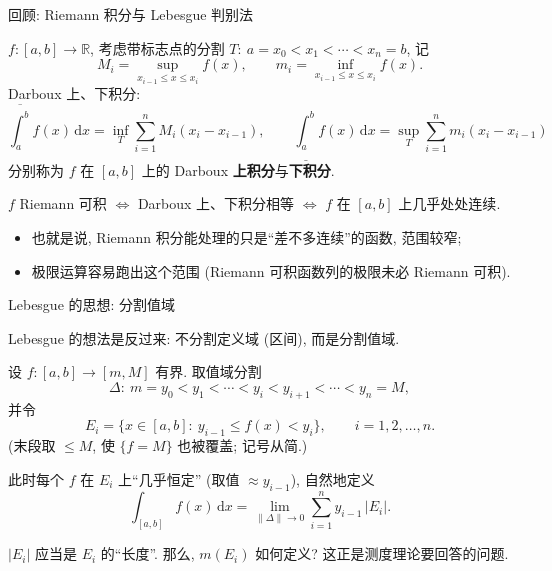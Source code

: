 \begin{frame}{回顾: Riemann 积分与 Lebesgue 判别法}

$f: [a,b] \to \mathbb{R}$, 考虑带标志点的分割 $T:\ a = x_0 < x_1 < \cdots < x_n = b$, 记
\[
M_i = \sup_{x_{i-1} \leqslant x \leqslant x_i} f(x), \qquad
m_i = \inf_{x_{i-1} \leqslant x \leqslant x_i} f(x).
\]
Darboux 上、下积分:
\[
\overline{\int_a^{b}} f(x)\,\mathrm{d}x = \inf_T \sum_{i=1}^n M_i (x_i - x_{i-1}), \qquad
\underline{\int_a^{b}} f(x)\,\mathrm{d}x = \sup_T \sum_{i=1}^n m_i (x_i - x_{i-1})
\]
分别称为 $f$ 在 $[a,b]$ 上的 Darboux \textbf{上积分}与\textbf{下积分}.

\pause

\begin{thm}
$f$ Riemann 可积 $\iff$ Darboux 上、下积分相等 $\iff$ $f$ 在 $[a,b]$ 上\alert{几乎处处连续}.
\end{thm}

\pause

\begin{itemize}
\item 也就是说, Riemann 积分能处理的只是``差不多连续''的函数, \alert{范围较窄};
\item 极限运算容易跑出这个范围 (Riemann 可积函数列的极限未必 Riemann 可积).
\end{itemize}

\end{frame}


\begin{frame}{Lebesgue 的思想: 分割值域}

Lebesgue 的想法是反过来: \alert{不分割定义域 (区间), 而是分割值域}.

\pause

设 $f: [a,b] \to [m, M]$ 有界. 取值域分割
\[
\Delta:\ m = y_0 < y_1 < \cdots < y_i < y_{i+1} < \cdots < y_n = M,
\]
并令
\[
E_i = \{x \in [a,b]:\ y_{i-1} \leqslant f(x) < y_i\}, \qquad i = 1, 2, \ldots, n.
\]
(末段取 $\leqslant M$, 使 $\{f = M\}$ 也被覆盖; 记号从简.)

\pause

此时每个 $f$ 在 $E_i$ 上``几乎恒定'' (取值 $\approx y_{i-1}$), 自然地定义
\[
\int_{[a,b]} f(x)\,\mathrm{d}x = \lim_{\|\Delta\| \to 0} \sum_{i=1}^n y_{i-1}\, \big|E_i\big|.
\]

\pause

\begin{question}
$\big|E_i\big|$ 应当是 $E_i$ 的``长度''. 那么, \alert{$m(E_i)$ 如何定义?} 这正是测度理论要回答的问题.
\end{question}

\end{frame}

